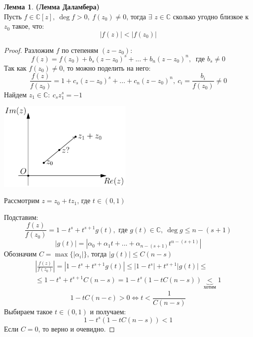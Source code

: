 \documentclass[a4paper, 12pt]{article}
\newcounter{lemcount}
\newcounter{lemcount2}
\theoremstyle{definition}
\newtheorem{lemmanum}[lemcount]{Лемма}
\begin{document}
  \begin{lemmanum}\textbf{(Лемма Даламбера)} \\
    Пусть $f \in \mathbb{C}[z], \ \deg f >0, \ f(z_0) \neq 0$, тогда $\exists$ $z \in \mathbb{C}$ сколько угодно близкое  к $z_0$ такое, что:
    $$|f(z)|< |f(z_0)|$$ 
  \end{lemmanum} 
  \begin{proof}
    Разложим $f$ по степеням $(z-z_0)$:
    $$f(z) = f(z_0) + b_s(z-z_0)^s + ... + b_n(z-z_0)^n, \ \text{ где } b_s \neq 0$$
    Так как $f(z_0) \neq 0$, то можно поделить на него:
    $$\frac{f(z)}{f(z_0)} = 1 + c_s(z-z_0)^s + ... + c_n(z-z_0)^n, \ c_i = \frac{b_i}{f(z_0)} \neq 0$$  
    Найдем $z_1 \in \mathbb{C}: \ c_sz_1^s = -1$
    \begin{center}
      \includegraphics[width=6.5cm]{image/lecture-22.pdf}
    \end{center}

    \begin{center}
      Рассмотрим $z = z_0 + tz_1$, где $t \in (0,1)$
    \end{center}
    Подставим: 
    $$\frac{f(z)}{f(z_0)} = 1 - t^s + t^{s+1} g(t), \text{ где } g(t) \in \mathbb{C}, \ \deg g \leq n-(s+1)$$
    $$|g(t)| = |\alpha_0 + \alpha_1t + ... + \alpha_{n-(s+1)}t^{n-(s+1)}|$$ 
    Обозначим $C = \max\{|\alpha_i|\}$, тогда $|g(t)|\leq C(n-s)$
    \begin{multline*}
      |\frac{f(z)}{f(z_0)}| = |1 - t^s + t^{s+1} g(t)| \leq |1 - t^s| + t^{s+1} |g(t)| \leq \\ \leq 1 - t^s + t^{s+1} C(n-s) = 1 - t^s(1-tC(n-s)) \underbrace{<}_{\text{хотим}} 1
    \end{multline*} 
     $$1-tC(n-c)>0 \Longleftrightarrow t<\frac{1}{C(n-s)}$$
     Выбираем такое $t \in (0,1)$ и получаем:
     $$1-t^s(1-tC(n-s)) < 1$$
     Если $C=0$, то верно и очевидно.   
  \end{proof}
\end{document}
